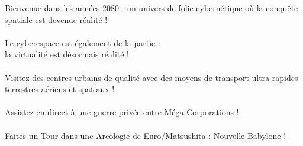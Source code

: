 \documentclass[40pt,twoside,a4paper]{article}
\begin{document}
\begin{landscape}
\begin{minipage}[ht]{0.10\textwidth}
		\end{minipage} \hfill \begin{minipage}[ht]{0.90\textwidth}
			{\Large
				Bienvenue dans les ann{\'e}es 2080 : un univers de folie cybern{\'e}tique o{\`u} la conqu{\^e}te spatiale est devenue r{\'e}alit{\'e} !~\\~\\
				Le cyberespace est {\'e}galement de la partie : ~\\ la virtualit{\'e} est d{\'e}sormais r{\'e}alit{\'e} !~\\~\\
				Visitez des centres urbains de qualit{\'e} avec des moyens de transport ultra-rapides terrestres a{\'e}riens et spatiaux !~\\~\\
				Assistez en direct {\`a} une guerre priv{\'e}e entre M{\'e}ga-Corporations !~\\~\\
				Faites un Tour dans une Arcologie de Euro/Matsushita : Nouvelle Babylone !~\\~\\
			}
		\end{minipage} \hfill \begin{minipage}[ht]{0.10\textwidth}

\end{minipage}
\end{landscape}
\end{document}
